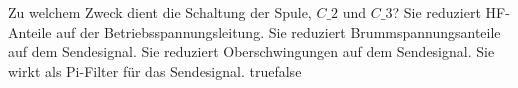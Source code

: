     {Zu welchem Zweck dient die Schaltung der Spule, $C\_2$ und $C\_3$?}
    {Sie reduziert HF-Anteile auf der Betriebsspannungsleitung.}
    {Sie reduziert Brummspannungsanteile auf dem Sendesignal.}
    {Sie reduziert Oberschwingungen auf dem Sendesignal.}
    {Sie wirkt als Pi-Filter für das Sendesignal.}
    {true}{false}